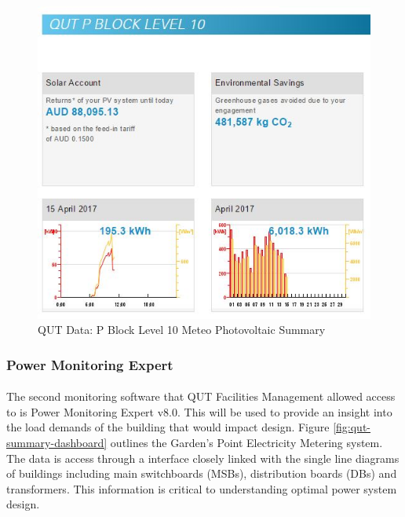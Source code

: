 \begin{figure}[H]
	\hfill\includegraphics[width = 150mm]{images/metering/meteo/lvl10-summary-page}\hspace*{\fill}
	\caption{QUT Data: P Block Level 10 Meteo Photovoltaic Summary} 
	\label{fig:qut-lvl10-meteo-summary}
\end{figure}

\subsubsection{Power Monitoring Expert}

\paragraph{}
The second monitoring software that QUT Facilities Management allowed access to is Power Monitoring Expert v8.0. This will be used to provide an insight into the load demands of the building that would impact design. Figure \ref{fig:qut-summary-dashboard} outlines the Garden's Point Electricity Metering system. The data is access through a interface closely linked with the single line diagrams of buildings including main switchboards (MSBs), distribution boards (DBs) and transformers. This information is critical to understanding optimal power system design.   


